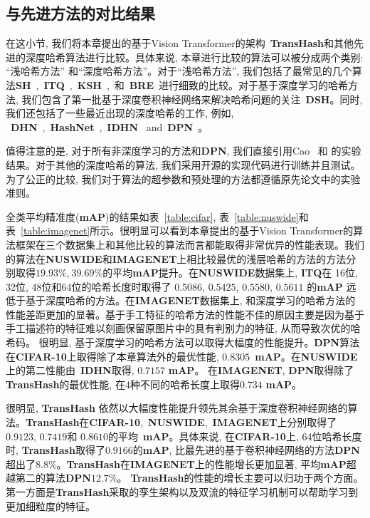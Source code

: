 \subsection{与先进方法的对比结果}
在这小节, 我们将本章提出的基于Vision Transformer的架构~\textbf{TransHash}和其他先进的深度哈希算法进行比较。具体来说, 本章进行比较的算法可以被分成两个类别: ``浅哈希方法'' 和``深度哈希方法''。对于``浅哈希方法'', 我们包括了最常见的几个算法\textbf{SH}~\cite{weiss2008spectral},~\textbf{ITQ}~\cite{gong2012iterative},~\textbf{KSH}~\cite{liu2012supervised},~和~\textbf{BRE}~\cite{kulis2009learning}进行细致的比较。对于基于深度学习的哈希方法, 我们包含了第一批基于深度卷积神经网络来解决哈希问题的关注~\textbf{DSH}\cite{liu2016deep12}。同时, 我们还包括了一些最近出现的深度哈希的工作, 例如, ~\textbf{DHN}~\cite{zhu2016deep},~\textbf{HashNet}~\cite{cao2017hashnet},~\textbf{IDHN}~\cite{zhang2019improved} and~\textbf{DPN}~\cite{fan20deep}。 \par
值得注意的是, 对于所有非深度学习的方法和\textbf{DPN}, 我们直接引用Cao~\cite{cao2017hashnet} 和 \cite{fan20deep}的实验结果。对于其他的深度哈希的算法, 我们采用开源的实现代码进行训练并且测试。为了公正的比较, 我们对于算法的超参数和预处理的方法都遵循原先论文中的实验准则。 \par
全类平均精准度(\textbf{mAP})的结果如表~\ref{table:cifar}, 表~\ref{table:nuswide}和表~\ref{table:imagenet}所示。很明显可以看到本章提出的基于Vision Transformer的算法框架在三个数据集上和其他比较的算法而言都能取得非常优异的性能表现。我们的算法在\textbf{NUSWIDE}和\textbf{IMAGENET}上相比较最优的浅层哈希的方法的方法分别取得$19.93\%$,$~39.69\%$的平均\textbf{mAP}提升。在\textbf{NUSWIDE}数据集上, \textbf{ITQ}在 16位, 32位, 48位和64位的哈希长度时取得了 $0.5086$, $0.5425$, $0.5580$, $0.5611$ 的\textbf{mAP} 远低于基于深度哈希的方法。在\textbf{IMAGENET}数据集上, 和深度学习的哈希方法的性能差距更加的显著。基于手工特征的哈希方法的性能不佳的原因主要是因为基于手工描述符的特征难以刻画保留原图片中的具有判别力的特征, 从而导致次优的哈希码。 很明显, 基于深度学习的哈希方法可以取得大幅度的性能提升。\textbf{DPN}算法在\textbf{CIFAR-10}上取得除了本章算法外的最优性能, $0.8305$~\textbf{mAP}。在\textbf{NUSWIDE}上的第二性能由~\textbf{IDHN}取得, $0.7157$ \textbf{mAP}。 在\textbf{IMAGENET}, \textbf{DPN}取得除了\textbf{TransHash}的最优性能, 在4种不同的哈希长度上取得$0.734 $ \textbf{mAP}。\par
很明显, \textbf{TransHash} 依然以大幅度性能提升领先其余基于深度卷积神经网络的算法。\textbf{TransHash}在\textbf{CIFAR-10},~\textbf{NUSWIDE},~\textbf{IMAGENET}上分别取得了$0.9123 $, $0.7419$和 $0.8610$的平均~\textbf{mAP}。具体来说, 在\textbf{CIFAR-10}上, 64位哈希长度时, \textbf{TransHash}取得了$0.9166$的\textbf{mAP}, 比最先进的基于卷积神经网络的方法\textbf{DPN}超出了$8.8 \%$。\textbf{TransHash}在\textbf{IMAGENET}上的性能增长更加显著, 平均\textbf{mAP}超越第二的算法\textbf{DPN}$12.7\%$。 \textbf{TransHash}的性能的增长主要可以归功于两个方面。第一方面是\textbf{TransHash}采取的孪生架构以及双流的特征学习机制可以帮助学习到更加细粒度的特征。


